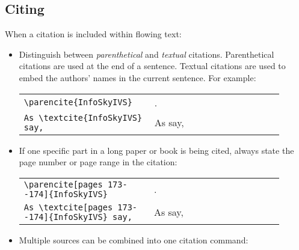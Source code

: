 \subsection{Citing}

When a citation is included within flowing text:
\begin{itemize}
      \item Distinguish between \emph{parenthetical} and \emph{textual}
            citations. Parenthetical citations are used at the end of a
            sentence. Textual citations are used to embed the authors' names in
            the current sentence. For example:

            \begin{small}
                  \hspace{2\parindent}
                  \renewcommand{\arraystretch}{1.5}
                  \begin{tabular}{p{0.45\linewidth}p{0.45\linewidth}}
                        \lstinline|\parencite{InfoSkyIVS}| & \parencite{InfoSkyIVS}.       \\
                        \lstinline|As \textcite{InfoSkyIVS} say,| & As \textcite{InfoSkyIVS} say,
                  \end{tabular}
            \end{small}



      \item If one specific part in a long paper or book is being cited,
            always state the page number or page range in the citation:

            \begin{small}
                  \hspace{2\parindent}
                  \renewcommand{\arraystretch}{1.5}
                  \begin{tabular}{p{0.45\linewidth}p{0.45\linewidth}}
                        \lstinline|\parencite[pages 173--174]{InfoSkyIVS}| &
                        \parencite[pages 173--174]{InfoSkyIVS}. \\
                        \lstinline|As \textcite[pages 173--174]{InfoSkyIVS} say,| &
                        As \textcite[pages 173--174]{InfoSkyIVS} say,
                  \end{tabular}
            \end{small}



      \item Multiple sources can be combined into one citation
            command:


\end{itemize}
